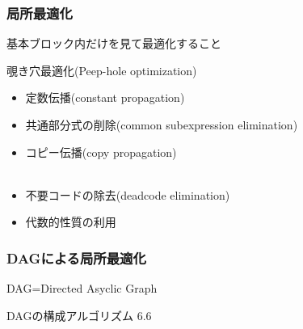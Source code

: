 \documentclass[dvipdfmx]{beamer}
\begin{document}
\begin{frame}
  \frametitle{局所最適化}

  基本ブロック内だけを見て最適化すること

  覗き穴最適化(Peep-hole optimization)

  \begin{itemize}
    \item 定数伝播(constant propagation)\\
    \item 共通部分式の削除(common subexpression elimination)\\
    \item コピー伝播(copy propagation)\\
          \\
    \item 不要コードの除去(deadcode elimination)\\
    \item 代数的性質の利用\\
  \end{itemize}
\end{frame}

\begin{frame}
  \frametitle{DAGによる局所最適化}

  DAG=Directed Asyclic Graph\\


  DAGの構成アルゴリズム 6.6


\end{frame}
\end{document}

